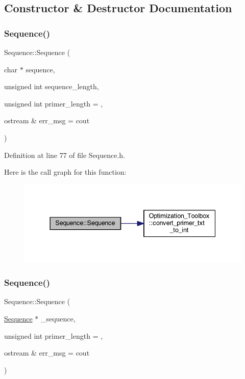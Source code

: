 \subsection{Constructor \& Destructor Documentation}
\mbox{\label{class_sequence_acdd11b606b266e81cc5b957e86b45517}} 
\subsubsection{\texorpdfstring{Sequence()}{Sequence()}\hspace{0.1cm}{\footnotesize\ttfamily [1/2]}}
{\footnotesize\ttfamily Sequence\+::\+Sequence (\begin{DoxyParamCaption}\item[{char $\ast$}]{sequence,  }\item[{unsigned int}]{sequence\+\_\+length,  }\item[{unsigned int}]{primer\+\_\+length = {},  }\item[{ostream \&}]{err\+\_\+msg = {\ttfamily cout} }\end{DoxyParamCaption})}



Definition at line 77 of file Sequence.\+h.

Here is the call graph for this function\+:
\nopagebreak
\begin{figure}[H]
\begin{center}
\leavevmode
\includegraphics[width=337pt]{class_sequence_acdd11b606b266e81cc5b957e86b45517_cgraph}
\end{center}
\end{figure}
\mbox{\label{class_sequence_ad6f16ee0cacbb22596c7a34d8a2f4c14}} 
\subsubsection{\texorpdfstring{Sequence()}{Sequence()}\hspace{0.1cm}{\footnotesize\ttfamily [2/2]}}
{\footnotesize\ttfamily Sequence\+::\+Sequence (\begin{DoxyParamCaption}\item[{\mbox{\hyperlink{class_sequence}{Sequence}} $\ast$}]{\+\_\+sequence,  }\item[{unsigned int}]{primer\+\_\+length = {},  }\item[{ostream \&}]{err\+\_\+msg = {\ttfamily cout} }\end{DoxyParamCaption})}



